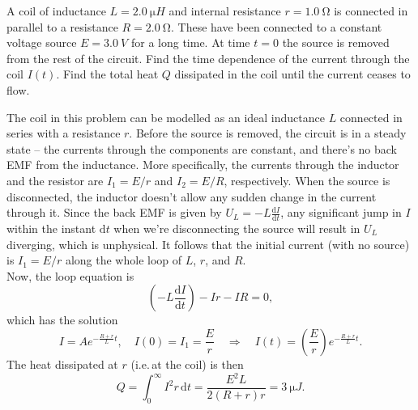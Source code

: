 \documentclass[../TST.tex]{subfiles}
\begin{document}
\begin{pproblem}
A coil of inductance $L=\qty{2.0}{\micro H}$ and internal resistance $r=\qty{1.0}{\ohm}$ is connected in parallel to a resistance $R=\qty{2.0}{\ohm}$. These have been connected to a constant voltage source $E=\qty{3.0}{V}$ for a long time. At time $t=0$ the source is removed from the rest of the circuit. Find the time dependence of the current through the coil $I(t)$. Find the total heat $Q$ dissipated in the coil until the current ceases to flow.
\end{pproblem}

\ifprob \else
	\begin{solution} The coil in this problem can be modelled as an ideal inductance $L$ connected in series with a resistance $r$. Before the source is removed, the circuit is in a steady state -- the currents through the components are constant, and there's no back EMF from the inductance. More specifically, the currents through the inductor and the resistor are $I_1=E/r$ and $I_2=E/R$, respectively. When the source is disconnected, the inductor doesn't allow any sudden change in the current through it. Since the back EMF is given by $U_L=-L \frac{\mathrm{d}I}{\mathrm{d}t}$, any significant jump in $I$ within the instant $\mathrm{d}t$ when we're disconnecting the source will result in $U_L$ diverging, which is unphysical. It follows that the initial current (with no source) is $I_1=E/r$ along the whole loop of $L$, $r$, and $R$.\\[5pt]
		Now, the loop equation is
		\begin{equation*}
		\left(-L \frac{\mathrm{d}I}{\mathrm{d}t}\right) - Ir-IR=0,
		\end{equation*}
which has the solution
\begin{equation*}
I=A e^{-\frac{R+r}{L}t}, \quad I(0)=I_1=\frac{E}{r} \quad\Rightarrow\quad \boxed{I(t)=\left( \frac{E}{r}\right)e^{-\frac{R+r}{L}t}.}
\end{equation*}
The heat dissipated at $r$ (i.e.\,at the coil) is then
\begin{equation*}
	Q=\int_0^\infty I^2r\, \mathrm{d}t= \boxed{\frac{E^2L}{2(R+r)r}=\qty{3}{\micro J}.}
\end{equation*}

\end{solution}
\fi
\end{document}
